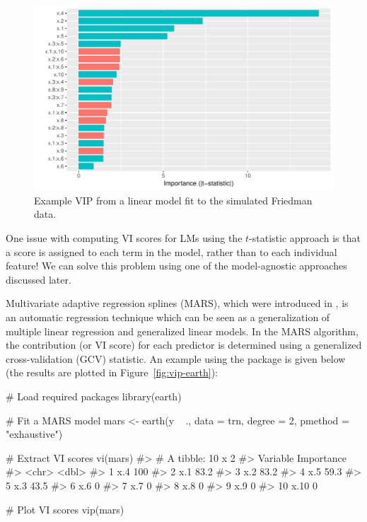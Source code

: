 \begin{figure}[!htb]
  \centering 
  \includegraphics[width=1\linewidth]{figures/vip-step} 
  \caption{Example VIP from a linear model fit to the simulated Friedman data.}
  \label{fig:vip-step}
\end{figure}

One issue with computing VI scores for LMs using the $t$-statistic approach is that a score is assigned to each term in the model, rather than to each individual feature! We can solve this problem using one of the model-agnostic approaches discussed later.

Multivariate adaptive regression splines (MARS), which were introduced in \citet{multivariate-friedman-1991}, is an automatic regression technique which can be seen as a generalization of multiple linear regression and generalized linear models. In the MARS algorithm, the contribution (or VI score) for each predictor is determined using a generalized cross-validation (GCV) statistic. An example using the  package \citep{earth-pkg} is given below (the results are plotted in Figure~\ref{fig:vip-earth}):

\begin{example}
# Load required packages
library(earth)

# Fit a MARS model
mars <- earth(y ~ ., data = trn, degree = 2, pmethod = "exhaustive")

# Extract VI scores
vi(mars)
#> # A tibble: 10 x 2
#>    Variable Importance
#>    <chr>         <dbl>
#>  1 x.4           100  
#>  2 x.1            83.2
#>  3 x.2            83.2
#>  4 x.5            59.3
#>  5 x.3            43.5
#>  6 x.6             0  
#>  7 x.7             0  
#>  8 x.8             0  
#>  9 x.9             0  
#> 10 x.10            0

# Plot VI scores
vip(mars)
\end{example}

